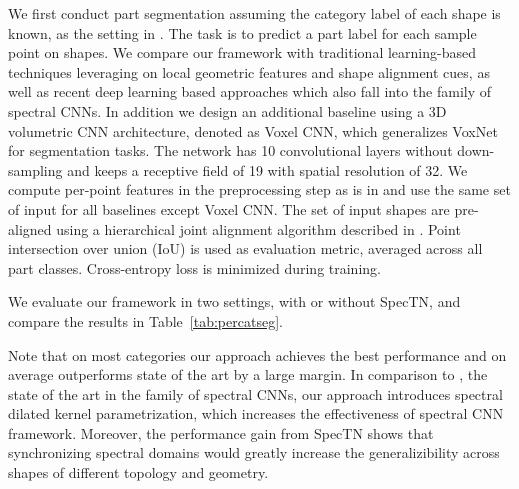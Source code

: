 We first conduct part segmentation assuming the category label of each shape is known, as the setting in \cite{Yi16}. The task is to predict a part label for each sample point on shapes. We compare our framework with traditional learning-based techniques \cite{wu2014interactive,Yi16} leveraging on local geometric features and shape alignment cues, as well as recent deep learning based approaches \cite{boscaini2016learning} which also fall into the family of spectral CNNs. In addition we design an additional baseline using a 3D volumetric CNN architecture, denoted as Voxel CNN, which generalizes VoxNet~\cite{maturana2015voxnet} for segmentation tasks. The network has 10 convolutional layers without down-sampling and keeps a receptive field of 19 with spatial resolution of 32. We compute per-point features in the preprocessing step as is in \cite{Yi16} and use the same set of input for all baselines except Voxel CNN. The set of input shapes are pre-aligned using a hierarchical joint alignment algorithm described in \cite{shapenet2015}. Point intersection over union (IoU) is used as evaluation metric, averaged across all part classes. Cross-entropy loss is minimized during training. 

We evaluate our framework in two settings, with or without SpecTN, and compare the results in Table~\ref{tab:percatseg}. %

Note that on most categories our approach achieves the best performance and on average outperforms state of the art by a large margin. In comparison to \cite{boscaini2016learning},  the state of the art in the family of spectral CNNs, our approach introduces spectral dilated kernel parametrization, which increases the effectiveness of spectral CNN framework.  Moreover, the performance gain from SpecTN shows that synchronizing spectral domains would greatly increase the generalizibility across shapes of different topology and geometry. 

